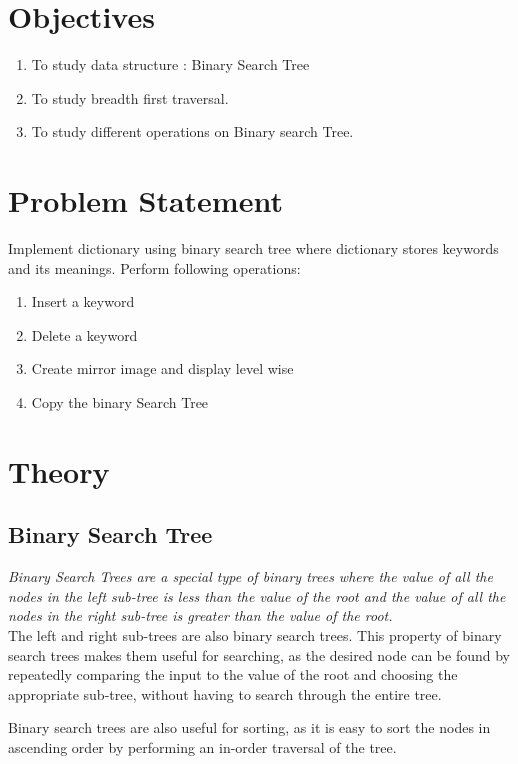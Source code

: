 \documentclass[11pt]{article}
\begin{document}
\tableofcontents
\thispagestyle{empty}
\clearpage

\setcounter{page}{1}

\section{Objectives}
\begin{enumerate}
    \item To study data structure : Binary Search Tree
    \item To study breadth first traversal.
    \item To study different operations on Binary search Tree.
\end{enumerate}

\section{Problem Statement}
Implement dictionary using binary search tree where dictionary stores keywords and its meanings.
Perform following operations:
\begin{enumerate}
    \item Insert a keyword
    \item Delete a keyword
    \item Create mirror image and display level wise
    \item Copy the binary Search Tree
\end{enumerate}

\section{Theory}
\subsection{Binary Search Tree}
\textit{Binary Search Trees are a special type of binary trees where the value of all the nodes in the left sub-tree is less than the value of the root and the value of all the nodes in the right sub-tree is greater than the value of the root.}\\

The left and right sub-trees are also binary search trees. This property of binary search trees makes them useful for searching, as the desired node can be found by repeatedly comparing the input to the value of the root and choosing the appropriate sub-tree, without having to search through the entire tree.

Binary search trees are also useful for sorting, as it is easy to sort the nodes in ascending order by performing an in-order traversal of the tree.
\end{document}
